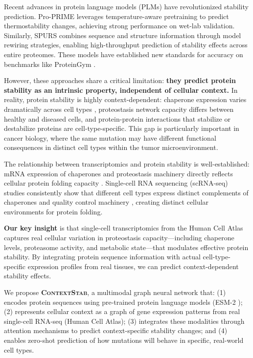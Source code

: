 \documentclass{article}
\newcommand{\contextstab}{\textsc{ContextStab}}
\begin{document}
Recent advances in protein language models (PLMs) have revolutionized stability prediction. Pro-PRIME \citep{hong2024proprime} leverages temperature-aware pretraining to predict thermostability changes, achieving strong performance on wet-lab validation. Similarly, SPURS \citep{li2025generalizable} combines sequence and structure information through model rewiring strategies, enabling high-throughput prediction of stability effects across entire proteomes. These models have established new standards for accuracy on benchmarks like ProteinGym \citep{notin2023proteingym}.

However, these approaches share a critical limitation: \textbf{they predict protein stability as an intrinsic property, independent of cellular context.} In reality, protein stability is highly context-dependent: chaperone expression varies dramatically across cell types \citep{brehme2014chaperome}, proteostasis network capacity differs between healthy and diseased cells, and protein-protein interactions that stabilize or destabilize proteins are cell-type-specific. This gap is particularly important in cancer biology, where the same mutation may have different functional consequences in distinct cell types within the tumor microenvironment.

The relationship between transcriptomics and protein stability is well-established: mRNA expression of chaperones and proteostasis machinery directly reflects cellular protein folding capacity \citep{akerfelt2010hsf1, spencer2012translation}. Single-cell RNA sequencing (scRNA-seq) studies consistently show that different cell types express distinct complements of chaperones and quality control machinery \citep{regev2017human}, creating distinct cellular environments for protein folding.

\textbf{Our key insight} is that single-cell transcriptomics from the Human Cell Atlas captures real cellular variation in proteostasis capacity---including chaperone levels, proteasome activity, and metabolic state---that modulates effective protein stability. By integrating protein sequence information with actual cell-type-specific expression profiles from real tissues, we can predict context-dependent stability effects.

We propose \textbf{\contextstab}, a multimodal graph neural network that: (1) encodes protein sequences using pre-trained protein language models (ESM-2 \citep{lin2023esm2}); (2) represents cellular context as a graph of gene expression patterns from real single-cell RNA-seq (Human Cell Atlas); (3) integrates these modalities through attention mechanisms to predict context-specific stability changes; and (4) enables zero-shot prediction of how mutations will behave in specific, real-world cell types.
\end{document}
